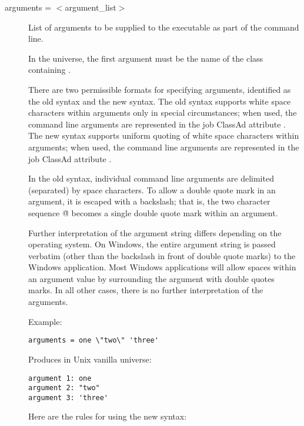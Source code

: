 \begin{description} 


\label{man-condor-submit-arguments}
\item[arguments = $<$argument\_list$>$]
List of arguments to be supplied
to the executable as part of the command line.

In the  universe, the first
argument must be the name of the class containing .

There are two permissible formats for specifying arguments,
identified as the old syntax and the new syntax.
The old syntax supports white space characters within arguments
only in special circumstances;
when used, the command line arguments are represented in the
job ClassAd attribute .
The new syntax 
supports uniform quoting of white space characters within arguments;
when used, the command line arguments are represented in the
job ClassAd attribute .


In the old syntax, individual command line arguments are delimited 
(separated) by space characters.
To allow a double quote mark in an argument,
it is escaped with a backslash; that is,
the two character sequence \verb@\"@
becomes a single double quote mark within an argument.

Further interpretation of the argument string differs depending on the
operating system.  On Windows, the entire argument string is
passed verbatim (other than the backslash in front of double quote marks)
to the Windows application.  
Most Windows applications
will allow spaces within an argument value by surrounding
the argument with double quotes marks.
In all
other cases, there is no further interpretation of the arguments.

Example:

\begin{verbatim}
arguments = one \"two\" 'three'
\end{verbatim}

Produces in Unix vanilla universe:

\begin{verbatim}
argument 1: one
argument 2: "two"
argument 3: 'three'
\end{verbatim}


Here are the rules for using the new syntax:


\end{description}
